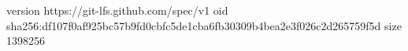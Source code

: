 version https://git-lfs.github.com/spec/v1
oid sha256:df107f0af925bc57b9fd0cbfc5de1cba6fb30309b4bea2e3f026c2d265759f5d
size 1398256
